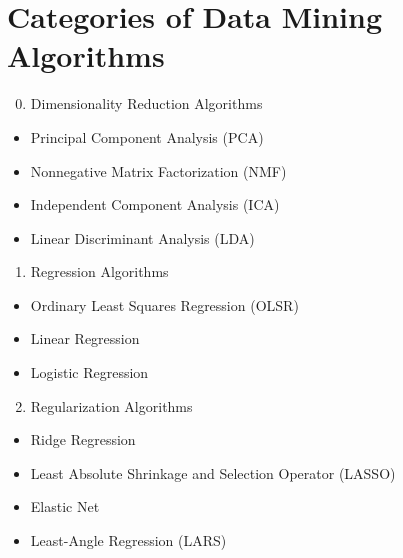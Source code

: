 \documentclass[letterpaper,11pt,english]{sphinxmanual}
\begin{document}
\section{Categories of Data Mining Algorithms}
\label{algsummary:jason-brownlee}\label{algsummary:categories-of-data-mining-algorithms}\begin{enumerate}
\setcounter{enumi}{-1}
\item {} 
Dimensionality Reduction Algorithms

\end{enumerate}
\begin{itemize}
\item {} 
Principal Component Analysis (PCA)

\item {} 
Nonnegative Matrix Factorization (NMF)

\item {} 
Independent Component Analysis (ICA)

\item {} 
Linear Discriminant Analysis (LDA)

\end{itemize}
\begin{enumerate}
\item {} 
Regression Algorithms

\end{enumerate}
\begin{itemize}
\item {} 
Ordinary Least Squares Regression (OLSR)

\item {} 
Linear Regression

\item {} 
Logistic Regression

\end{itemize}
\begin{enumerate}
\setcounter{enumi}{1}
\item {} 
Regularization Algorithms

\end{enumerate}
\begin{itemize}
\item {} 
Ridge Regression

\item {} 
Least Absolute Shrinkage and Selection Operator (LASSO)

\item {} 
Elastic Net

\item {} 
Least-Angle Regression (LARS)

\end{itemize}
\end{document}
